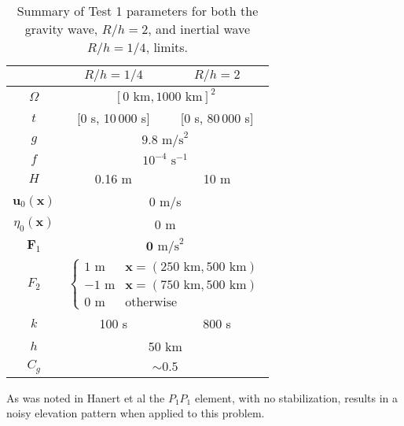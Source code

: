   \def\arraystretch{1.25} %
  \begin{table}[H]
    \begin{center}
      \begin{tabular}{|c|c|c|}
        \hline
        & $R/h = 1/4$ & $R/h = 2$ \\[0.1em] \hline
        $\Omega$ & \multicolumn{2}{c|}{$[0\text{ km}, 1000\text{ km}]^2$} \\ \hline
        $t$ & [0 s, 10\,000 s] & [0 s, 80\,000 s] \\ \hline
        $g$ & \multicolumn{2}{c|}{$9.8\text{ m/s}^2$} \\ \hline 
        $f$ & \multicolumn{2}{c|}{$10^{-4}\text{ s}^{-1}$} \\ \hline
        $H$ & 0.16 m & 10 m \\ \hline
        $\mathbf{u}_0(\mathbf{x})$ & \multicolumn{2}{c|}{0 m/s} \\ \hline
        $\eta_0(\mathbf{x})$ & \multicolumn{2}{c|}{0 m} \\ \hline
        $\mathbf{F}_1$ & \multicolumn{2}{c|}{ $\mathbf{0}\text{ m/s}^2$} \\ \hline
        $F_2$ & \multicolumn{2}{c|}{$
          \begin{cases} 
            1\text{ m} & \mathbf{x} = (250\text{ km}, 500\text{ km}) \\
            -1\text{ m} & \mathbf{x} = (750\text{ km}, 500\text{ km}) \\
            0\text{ m} & \text{otherwise}
          \end{cases}$} \\ \hline
        $k$ & 100 s & 800 s \\ \hline
        $h$ & \multicolumn{2}{c|}{50 km} \\ \hline
        $C_g$ & \multicolumn{2}{c|}{ $\sim 0.5$ }\\ \hline
      \end{tabular}
      \caption{Summary of Test 1 parameters for both the gravity wave, $R/h =
      2$, and inertial wave $R/h = 1/4$, limits.}
      \label{tab:HFElevationParams}
    \end{center}
  \end{table}

  As was noted in Hanert et al \cite{Hanert2002} the $P_1P_1$ element, with no
  stabilization, results in a noisy elevation pattern when applied to this
  problem. %

